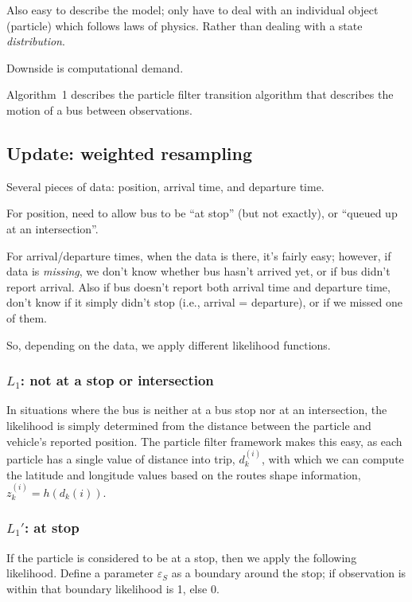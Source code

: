 \documentclass{IEEEtran}\usepackage[]{graphicx}\usepackage[]{color}
\begin{document}
Also easy to describe the model;
only have to deal with an individual object (particle) which follows laws of physics.
Rather than dealing with a state \emph{distribution}.

Downside is computational demand.

Algorithm~1 describes the particle filter transition algorithm that
describes the motion of a bus between observations.



\subsection{Update: weighted resampling}


Several pieces of data: position, arrival time, and departure time.

For position, need to allow bus to be ``at stop'' (but not exactly),
or ``queued up at an intersection''.

For arrival/departure times, when the data is there, it's fairly easy;
however, if data is \emph{missing}, we don't know whether bus hasn't arrived yet,
or if bus didn't report arrival.
Also if bus doesn't report both arrival time and departure time,
don't know if it simply didn't stop (i.e., arrival = departure),
or if we missed one of them.

So, depending on the data, we apply different likelihood functions.


\subsubsection[L1]{$L_1$: not at a stop or intersection}

In situations where the bus is neither at a bus stop nor at an intersection,
the likelihood is simply determined from the distance between the particle and 
vehicle's reported position.
The particle filter framework makes this easy,
as each particle has a single value of distance into trip, $d_k^{(i)}$,
with which we can compute the latitude and longitude values based on 
the routes shape information, $z_k^{(i)} = h(d_k{(i)})$.


\subsubsection[L1b]{$L_1'$: at stop}

If the particle is considered to be at a stop, then we apply the following likelihood.
Define a parameter $\varepsilon_S$ as a boundary around the stop;
if observation is within that boundary likelihood is 1, else 0.
\end{document}

